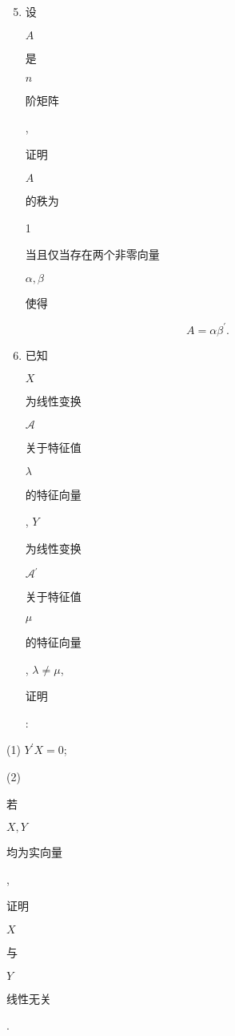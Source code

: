 \documentclass[10pt]{article}
\begin{document}
\begin{enumerate}
  \setcounter{enumi}{4}
  \item \begin{CJK}{UTF8}{mj}设\end{CJK} $A$ \begin{CJK}{UTF8}{mj}是\end{CJK} $n$ \begin{CJK}{UTF8}{mj}阶矩阵\end{CJK}, \begin{CJK}{UTF8}{mj}证明\end{CJK} $A$ \begin{CJK}{UTF8}{mj}的秩为\end{CJK} 1 \begin{CJK}{UTF8}{mj}当且仅当存在两个非零向量\end{CJK} $\alpha, \beta$ \begin{CJK}{UTF8}{mj}使得\end{CJK}
\end{enumerate}
$$
A=\alpha \beta^{\prime} .
$$

\begin{enumerate}
  \setcounter{enumi}{5}
  \item \begin{CJK}{UTF8}{mj}已知\end{CJK} $X$ \begin{CJK}{UTF8}{mj}为线性变换\end{CJK} $\mathscr{A}$ \begin{CJK}{UTF8}{mj}关于特征值\end{CJK} $\lambda$ \begin{CJK}{UTF8}{mj}的特征向量\end{CJK}, $Y$ \begin{CJK}{UTF8}{mj}为线性变换\end{CJK} $\mathscr{A}{ }^{\prime}$ \begin{CJK}{UTF8}{mj}关于特征值\end{CJK} $\mu$ \begin{CJK}{UTF8}{mj}的特征向量\end{CJK}, $\lambda \neq \mu$, \begin{CJK}{UTF8}{mj}证明\end{CJK}:
\end{enumerate}
(1) $Y^{\prime} X=0$;

(2) \begin{CJK}{UTF8}{mj}若\end{CJK} $X, Y$ \begin{CJK}{UTF8}{mj}均为实向量\end{CJK}, \begin{CJK}{UTF8}{mj}证明\end{CJK} $X$ \begin{CJK}{UTF8}{mj}与\end{CJK} $Y$ \begin{CJK}{UTF8}{mj}线性无关\end{CJK}.
\end{document}
